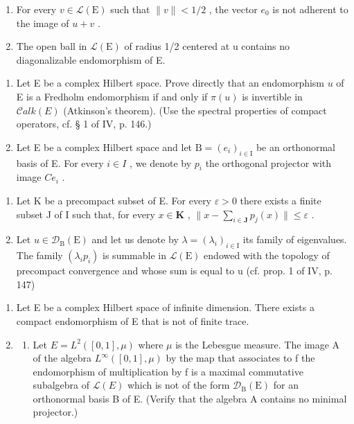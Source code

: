 \begin{enumerate}
\def\labelenumi{\alph{enumi})}
\item
  For every \(v \in \mathcal{L}(\mathrm{E})\) such that \(\|v\| < 1/2\) , the vector \(e_{0}\) is not adherent to the image of \(u + v\) .
\item
  The open ball in \(\mathcal{L}(\mathrm{E})\) of radius 1/2 centered at u contains no diagonalizable endomorphism of E.
\end{enumerate}

\begin{enumerate}
\def\labelenumi{\arabic{enumi})}
\setcounter{enumi}{1}
\item
  Let E be a complex Hilbert space. Prove directly that an endomorphism \(u\) of E is a Fredholm endomorphism if and only if \(\pi(u)\) is invertible in \(\mathcal{C}alk(E)\) (Atkinson's theorem). (Use the spectral properties of compact operators, cf. § 1 of IV, p. 146.)
\item
  Let E be a complex Hilbert space and let \(\mathrm{B}=(e_{i})_{i\in\mathrm{I}}\) be an orthonormal basis of E. For every \(i\in I\) , we denote by \(p_{i}\) the orthogonal projector with image \(Ce_{i}\) .
\end{enumerate}

\begin{enumerate}
\def\labelenumi{\alph{enumi})}
\item
  Let K be a precompact subset of E. For every \(\varepsilon > 0\) there exists a finite subset J of I such that, for every \(x \in \mathbf{K}\) , \(\|x - \sum_{i \in \mathbf{J}} p_j(x)\| \leqslant \varepsilon\) .
\item
  Let \(u \in \mathcal{D}_{\mathrm{B}}(\mathrm{E})\) and let us denote by \(\lambda = (\lambda_{i})_{i \in \mathrm{I}}\) its family of eigenvalues. The family \((\lambda_{i} p_{i})\) is summable in \(\mathcal{L}(\mathrm{E})\) endowed with the topology of precompact convergence and whose sum is equal to u (cf. prop. 1 of IV, p. 147)
\end{enumerate}

\begin{enumerate}
\def\labelenumi{\arabic{enumi})}
\setcounter{enumi}{3}
\item
  Let E be a complex Hilbert space of infinite dimension. There exists a compact endomorphism of E that is not of finite trace.
\item
  \begin{enumerate}
  \def\labelenumii{\alph{enumii})}
  \tightlist
  \item
  Let \(E = L^{2}([0,1], \mu)\) where \(\mu\) is the Lebesgue measure. The image A of the algebra \(L^{\infty}([0,1], \mu)\) by the map that associates to f the endomorphism of multiplication by f is a maximal commutative subalgebra of \(\mathcal{L}(E)\) which is not of the form \(\mathcal{D}_{\mathrm{B}}(\mathrm{E})\) for an orthonormal basis B of E. (Verify that the algebra A contains no minimal projector.)
  \end{enumerate}
\end{enumerate}

